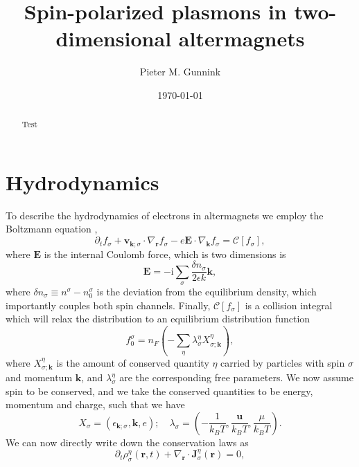 \documentclass[aps,prb,reprint,twocolumns,superscriptaddress,nofootinbib]{revtex4-2}
\newcommand{\ii}{\mathrm{i}}
\begin{document}
	\title{Spin-polarized plasmons in two-dimensional altermagnets}
	\date{\today}
	
	\author{Pieter M. Gunnink}
	\begin{abstract}
		Test
	\end{abstract}
	
	\maketitle
	
	
	\section{Hydrodynamics}
To describe the hydrodynamics of electrons in altermagnets we employ the Boltzmann equation \cite{lucas},
\begin{equation}
	\partial_t f_\sigma + \bm v_{\bm k;\sigma} \cdot \nabla_{\bm r}f_\sigma - e \bm E \cdot \nabla_{\bm k}f_\sigma = \mathcal C[f_\sigma],
\end{equation}
where $\bm E$ is the internal Coulomb force, which is two dimensions is
\begin{equation}
	\bm E = -\ii\sum_\sigma \frac{\delta n_\sigma}{2\epsilon k}\bm k,
\end{equation} 	 
where $\delta n_\sigma\equiv n^\sigma - n_0^\sigma$ is the deviation from the equilibrium density, which importantly couples both spin channels.	Finally, $\mathcal C[f_\sigma]$ is a collision integral which will relax the distribution to an equilibrium distribution function
\begin{equation}
	f_0^\sigma = n_F\left(- \sum_\eta \lambda_\sigma^\eta X^\eta_{\sigma;\bm k}  \right),
\end{equation}
where $X^\eta_{\sigma;\bm k}$ is the amount of conserved quantity $\eta$ carried by particles with spin $\sigma$ and momentum $\bm k$, and $\lambda^\eta_\sigma$ are the corresponding free parameters. We now assume spin to be conserved, and we take the conserved quantities to be energy, momentum and charge, such that we have 
\begin{equation}
	X_\sigma = \left(\epsilon_{\bm k;\sigma}, \bm k, e\right);\quad \lambda_\sigma = \left(-\frac{1}{k_B T}, \frac{\bm u}{k_B T}, \frac{\mu}{k_B T}\right).
\end{equation}
We can now directly write down the conservation laws as
\begin{equation}
	\partial_t \rho^\eta_\sigma(\bm r,t) + \nabla_{\bm r} \cdot \bm J^\eta_\sigma(\bm r) = 0,
\end{equation}
\end{document}
